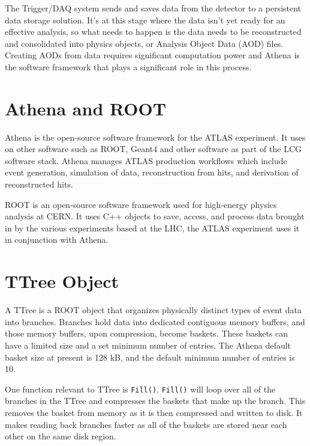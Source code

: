 The Trigger/DAQ system sends and saves data from the detector to a persistent data storage solution.
It's at this stage where the data isn't yet ready for an effective analysis, so what needs to happen is the data needs to be reconstructed and consolidated into physics objects, or Analysis Object Data (AOD) files.
Creating AODs from data requires significant computation power and Athena is the software framework that plays a significant role in this process.

\section{Athena and ROOT}
Athena is the open-source software framework for the ATLAS experiment.\cite{athena}
It uses on other software such as ROOT, Geant4 and other software as part of the LCG software stack. 
Athena manages ATLAS production workflows which include event generation, simulation of data, reconstruction from hits, and derivation of reconstructed hits.\cite{athenadocs}

ROOT is an open-source software framework used for high-energy physics analysis at CERN.\cite{ROOT_about} 
It uses C++ objects to save, access, and process data brought in by the various experiments based at the LHC, the ATLAS experiment uses it in conjunction with Athena.


\section{TTree Object} \label{section: ATLASIO_TTreeObject}
A TTree is a ROOT object that organizes physically distinct types of event data into branches.
Branches hold data into dedicated contiguous memory buffers, and those memory buffers, upon compression, become baskets.
These baskets can have a limited size and a set minimum number of entries. 
The Athena default basket size at present is 128 kB, and the default minimum number of entries is 10. 

One function relevant to TTree is \verb|Fill()|. 
\verb|Fill()| will loop over all of the branches in the TTree and compresses the baskets that make up the branch.
This removes the basket from memory as it is then compressed and written to disk.
It makes reading back branches faster as all of the baskets are stored near each other on the same disk region. \cite{ROOT_TTree}
 

